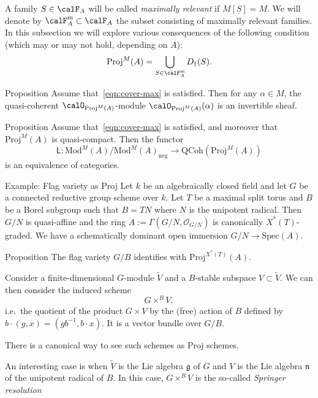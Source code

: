 \documentclass[9pt]{beamer}
\begin{document}
\begin{frame}

A family $S \in \calF_A$ will be called \emph{maximally relevant} if $M[\underline{S}]=M$.   We will denote by $\calF_A^{\mathrm{m}} \subset \calF_A$ the subset consisting of maximally relevant families. In this subsection we will explore various consequences of the following condition (which may or may not hold, depending on $A$):
\begin{equation}
\label{eqn:cover-max}
\mathrm{Proj}^M(A) = \bigcup_{S \in \calF_A^{\mathrm{m}}} D_\dag(S).
\end{equation}


\begin{block}{Proposition}
Assume that~\eqref{eqn:cover-max} is satisfied. Then for any $ \alpha \in M$, the quasi-coherent $\calO_{\mathrm{Proj}^M(A)}$-module $\calO_{\mathrm{Proj}^M(A)} (\alpha)$ is an invertible sheaf.
\end{block}

\begin{block}{Proposition}
Assume that~\eqref{eqn:cover-max} is satisfied, and moreover that $\mathrm{Proj}^M(A)$ is quasi-compact. Then the functor
\[
\mathsf{L} : \mathrm{Mod}^M(A) / \mathrm{Mod}^M(A)_{\mathrm{neg}} \to \mathrm{QCoh}(\mathrm{Proj}^M(A))
\]
is an equivalence of categories.
\end{block}
\end{frame}



\begin{frame}{Example: Flag variety as Proj}
 Let $k$ be an algebraically closed field and let $G$ be
a connected reductive group scheme over $k.$ Let $T$ be a maximal split torus
and $B$ be a Borel subgroup such that $B = T N$ where $N$ is the unipotent
radical. Then $G/N$ is quasi-affine and the ring $A := \Gamma (G/N, \mathcal{O}_{G/N} )$ is canonically $X^*(T)$-graded. We have a schematically dominant open immersion
$G/N \to \mathrm{Spec}(A)$. 

\begin{block}{Proposition}
The flag variety $G/B$ identifies with $\mathrm{Proj}^{X^*(T)} (A)$.
\end{block}
Consider a finite-dimensional $G$-module $\widetilde{V}$ and a $B$-stable subspace $V \subset \widetilde{V}$. 
We can then consider the induced scheme
\[
 G \times^{B} V,
\]
i.e.~the quotient of the product $G \times V$ by the (free) action of $B$ defined by $b \cdot (g,x) = (gb^{-1}, b \cdot x)$.  It is a vector bundle over $G/B$.

There is a canonical way to see such schemes as Proj schemes.

An interesting case is when $\widetilde{V}$ is the Lie algebra $\mathfrak{g}$ of $G$ and $V$ is the Lie algebra $\mathfrak{n}$ of the unipotent radical of $B$. In this case, $G \times^{B} V$ is the so-called \emph{Springer resolution}

\end{frame}
\end{document}
